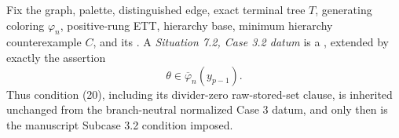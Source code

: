 \begin{definition}
Fix the graph, palette, distinguished edge, exact terminal tree \(T\),
generating coloring \(\varphi_n\), positive-rung ETT, hierarchy base,
minimum hierarchy counterexample \(C\), and its
.  A
\emph{Situation 7.2, Case 3.2 datum} is a
, extended by
exactly the assertion
\[
                 \theta\in\overline\varphi_n(y_{p-1}).
\]
Thus condition (20), including its divider-zero raw-stored-set clause,
is inherited unchanged from the branch-neutral normalized Case 3 datum,
and only then is the manuscript Subcase 3.2 condition imposed.
\end{definition}
